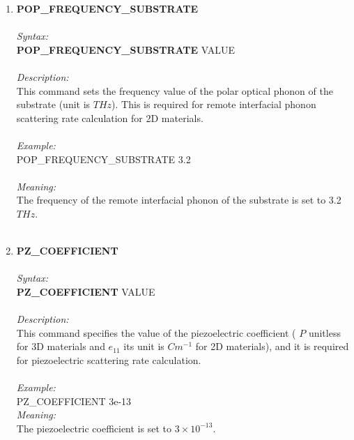 \documentclass[12pt]{article}
\begin{document}
\begin{enumerate}
    \item \textbf{POP\_FREQUENCY\_SUBSTRATE}   \\ \\
    \textit{Syntax:} \\
    \textbf{POP\_FREQUENCY\_SUBSTRATE} VALUE \\ \\
    \textit{Description:} \\
    This command sets the frequency value of the polar optical phonon of the substrate (unit is $THz$). This is required for remote interfacial phonon scattering rate calculation for 2D materials. \\ \\
    \textit{Example:} \\
    POP\_FREQUENCY\_SUBSTRATE 3.2 \\ \\
    \textit{Meaning:} \\   
    The frequency of the remote interfacial phonon of the substrate is set to 3.2 $THz$. \\ \\ 

    \item \textbf{PZ\_COEFFICIENT}   \\ \\
    \textit{Syntax:} \\
    \textbf{PZ\_COEFFICIENT} VALUE \\ \\
    \textit{Description:} \\
    This command specifies the value of the piezoelectric coefficient ( $P$ unitless for 3D materials and $e_{11}$ its unit is $Cm^{-1}$ for 2D materials), and it is required for piezoelectric scattering rate calculation. \\ \\
    \textit{Example:} \\
    PZ\_COEFFICIENT 3e-13 \\
    \textit{Meaning:} \\  
    The piezoelectric coefficient is set to $3 \times 10^{-13}$. \\ \\


\end{enumerate}
\end{document}
